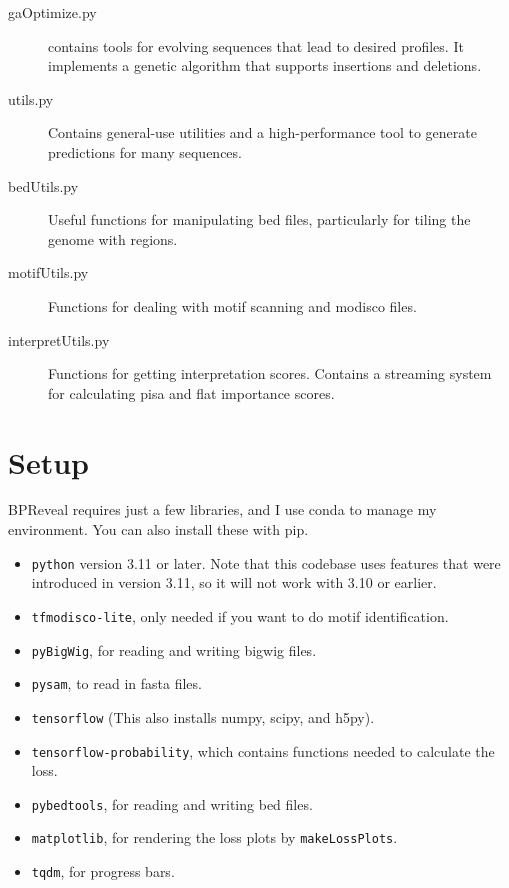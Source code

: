 \documentclass{article}
\begin{document}
\begin{description}
    \item [gaOptimize.py] contains tools for evolving sequences that lead to desired profiles.
        It implements a genetic algorithm that supports insertions and deletions.
    \item [utils.py] Contains general-use utilities and a high-performance tool to generate
        predictions for many sequences.
    \item [bedUtils.py] Useful functions for manipulating bed files, particularly for tiling
        the genome with regions.
    \item [motifUtils.py] Functions for dealing with motif scanning and modisco files.
    \item [interpretUtils.py] Functions for getting interpretation scores.
        Contains a streaming system for calculating pisa and flat importance scores.
\end{description}

\newpage

\section{Setup}

BPReveal requires just a few libraries, and I use conda to manage my environment.
You can also install these with pip.

\begin{itemize}
    \item \texttt{python} version 3.11 or later. Note that this codebase uses features that were
        introduced in version 3.11, so it will not work with 3.10 or earlier.
    \item \texttt{tfmodisco-lite}, only needed if you want to do motif identification.
    \item \texttt{pyBigWig}, for reading and writing bigwig files.
    \item \texttt{pysam}, to read in fasta files.
    \item \texttt{tensorflow} (This also installs numpy, scipy, and h5py).
    \item \texttt{tensorflow-probability}, which contains functions needed to calculate the loss.
    \item \texttt{pybedtools}, for reading and writing bed files.
    \item \texttt{matplotlib}, for rendering the loss plots by \texttt{makeLossPlots}.
    \item \texttt{tqdm}, for progress bars.
\end{itemize}
\end{document}
